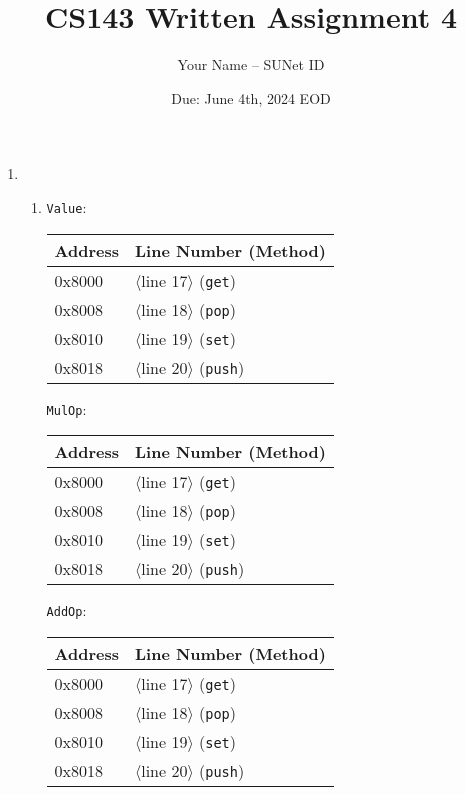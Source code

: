 \documentclass[12pt]{article}
\title{CS143 Written Assignment 4}
\author{Your Name -- SUNet ID}
\date{Due: June 4th, 2024 EOD}
\newcommand*{\lineref}[1]{$\langle$line #1$\rangle$}
\begin{document}
\maketitle

\begin{enumerate}

\item
    \begin{enumerate}

        \item
            \texttt{Value}:

            \begin{tabular}{ll}  %
                \hline
                Address & Line Number (Method) \\
                \hline
                0x8000 & \lineref{17} (\texttt{get}) \\
                0x8008 & \lineref{18} (\texttt{pop}) \\
                0x8010 & \lineref{19} (\texttt{set}) \\
                0x8018 & \lineref{20} (\texttt{push}) \\
                \hline
            \end{tabular}

            \vspace{1em}\texttt{MulOp}:

            \begin{tabular}{ll}
                \hline
                Address & Line Number (Method) \\
                \hline
                0x8000 & \lineref{17} (\texttt{get}) \\
                0x8008 & \lineref{18} (\texttt{pop}) \\
                0x8010 & \lineref{19} (\texttt{set}) \\
                0x8018 & \lineref{20} (\texttt{push}) \\
                \hline
            \end{tabular}

            \vspace{1em}\texttt{AddOp}:

            \begin{tabular}{ll}
                \hline
                Address & Line Number (Method) \\
                \hline
                0x8000 & \lineref{17} (\texttt{get}) \\
                0x8008 & \lineref{18} (\texttt{pop}) \\
                0x8010 & \lineref{19} (\texttt{set}) \\
                0x8018 & \lineref{20} (\texttt{push}) \\
                \hline
            \end{tabular}


\end{enumerate}
\end{enumerate}
\end{document}
